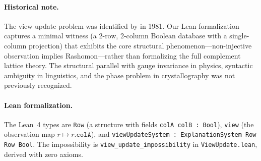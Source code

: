 \paragraph{Historical note.}
The view update problem was identified by \citet{bancilhon1981update} in 1981.
Our Lean formalization captures a minimal witness (a 2-row, 2-column Boolean
database with a single-column projection) that exhibits the core structural
phenomenon---non-injective observation implies Rashomon---rather than
formalizing the full complement lattice theory.  The structural parallel with
gauge invariance in physics, syntactic ambiguity in linguistics, and the phase
problem in crystallography was not previously recognized.

\paragraph{Lean formalization.}
The Lean~4 types are \texttt{Row} (a structure with fields
\texttt{colA colB : Bool}), \texttt{view} (the observation map
$r \mapsto r.\texttt{colA}$), and
\texttt{viewUpdateSystem : ExplanationSystem Row Row Bool}.
The impossibility is \texttt{view\_update\_impossibility} in
\texttt{ViewUpdate.lean}, derived with zero axioms.
